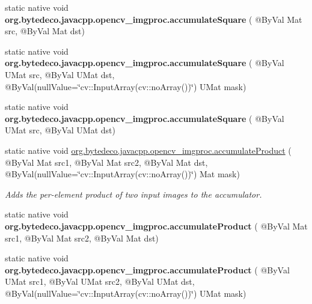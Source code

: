 \begin{DoxyCompactItemize}
\mbox{\label{group__imgproc__motion_ga4aab69ffaf1838e4fd3d3d3723540a9b}} 
static native void {\bfseries org.\+bytedeco.\+javacpp.\+opencv\+\_\+imgproc.\+accumulate\+Square} ( @By\+Val Mat src, @By\+Val Mat dst)
\item 
\mbox{\label{group__imgproc__motion_gadc9e5bb73c6c69c649ac0cc9b9a1e0da}} 
static native void {\bfseries org.\+bytedeco.\+javacpp.\+opencv\+\_\+imgproc.\+accumulate\+Square} ( @By\+Val U\+Mat src, @By\+Val U\+Mat dst, @By\+Val(null\+Value=\char`\"{}cv\+::\+Input\+Array(cv\+::no\+Array())\char`\"{}) U\+Mat mask)
\item 
\mbox{\label{group__imgproc__motion_gaf760a55d7db0c74aca5f467bec81a5ef}} 
static native void {\bfseries org.\+bytedeco.\+javacpp.\+opencv\+\_\+imgproc.\+accumulate\+Square} ( @By\+Val U\+Mat src, @By\+Val U\+Mat dst)
\item 
static native void \hyperlink{group__imgproc__motion_ga651a79607dc72d0697ca3dc5df6e9033}{org.\+bytedeco.\+javacpp.\+opencv\+\_\+imgproc.\+accumulate\+Product} ( @By\+Val Mat src1, @By\+Val Mat src2, @By\+Val Mat dst, @By\+Val(null\+Value=\char`\"{}cv\+::\+Input\+Array(cv\+::no\+Array())\char`\"{}) Mat mask)
\begin{DoxyCompactList}\small\item\em Adds the per-\/element product of two input images to the accumulator. \end{DoxyCompactList}\item 
\mbox{\label{group__imgproc__motion_ga2d58f97107418e5841b236d746e3341f}} 
static native void {\bfseries org.\+bytedeco.\+javacpp.\+opencv\+\_\+imgproc.\+accumulate\+Product} ( @By\+Val Mat src1, @By\+Val Mat src2, @By\+Val Mat dst)
\item 
\mbox{\label{group__imgproc__motion_ga3ed31f750907bc5355c48998d1cf4137}} 
static native void {\bfseries org.\+bytedeco.\+javacpp.\+opencv\+\_\+imgproc.\+accumulate\+Product} ( @By\+Val U\+Mat src1, @By\+Val U\+Mat src2, @By\+Val U\+Mat dst, @By\+Val(null\+Value=\char`\"{}cv\+::\+Input\+Array(cv\+::no\+Array())\char`\"{}) U\+Mat mask)
\item 
\mbox{\label{group__imgproc__motion_ga47bf9513803360121818a30e7a1e95ee}} 

\end{DoxyCompactItemize}
